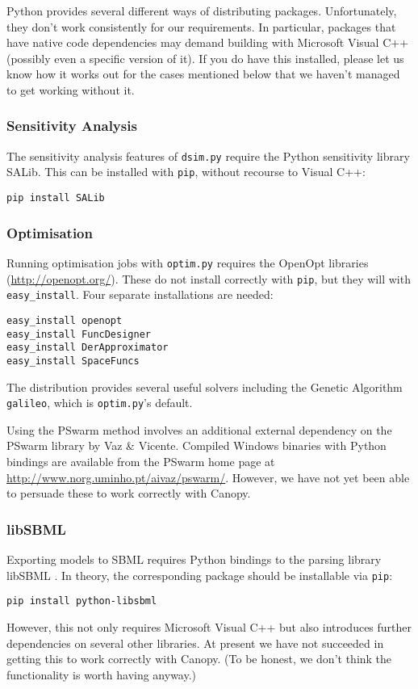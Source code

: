 \documentclass[a4paper,11pt]{article}
\begin{document}
Python provides several different ways of distributing packages. Unfortunately, they don't work consistently for our requirements. In particular, packages that have native code dependencies may demand building with Microsoft Visual C++ (possibly even a specific version of it). If you do have this installed, please let us know how it works out for the cases mentioned below that we haven't managed to get working without it.

\subsubsection{Sensitivity Analysis}

The sensitivity analysis features of \texttt{dsim.py} require the Python sensitivity library SALib. This can be installed with \texttt{pip}, without recourse to Visual C++:
\begin{verbatim}
pip install SALib
\end{verbatim}

\subsubsection{Optimisation}

Running optimisation jobs with \texttt{optim.py} requires the OpenOpt libraries (\url{http://openopt.org/}). These do not install correctly with \texttt{pip}, but they will with \texttt{easy\_install}. Four separate installations are needed:
\begin{verbatim}
easy_install openopt
easy_install FuncDesigner
easy_install DerApproximator
easy_install SpaceFuncs
\end{verbatim}
The distribution provides several useful solvers including the Genetic Algorithm \texttt{galileo}, which is \texttt{optim.py}'s default.

Using the PSwarm method involves an additional external dependency on the PSwarm library by Vaz \& Vicente. Compiled Windows binaries with Python bindings are available from the PSwarm home page at \url{http://www.norg.uminho.pt/aivaz/pswarm/}. However, we have not yet been able to persuade these to work correctly with Canopy.

\subsubsection{libSBML}

Exporting models to SBML requires Python bindings to the parsing library libSBML \citep{Bornstein:2008id}. In theory, the corresponding package should be installable via \texttt{pip}:
\begin{verbatim}
pip install python-libsbml
\end{verbatim}
However, this not only requires Microsoft Visual C++ but also introduces further dependencies on several other libraries. At present we have not succeeded in getting this to work correctly with Canopy. (To be honest, we don't think the functionality is worth having anyway.)
\end{document}
